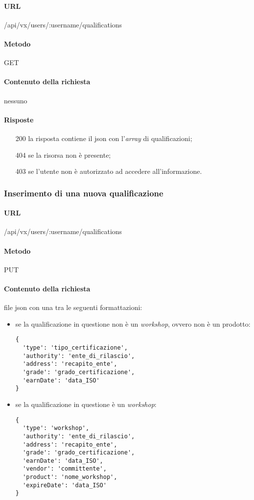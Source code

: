 \paragraph{URL}
/api/vx/users/:username/qualifications
\paragraph{Metodo}
GET
\paragraph{Contenuto della richiesta}
nessuno
\paragraph{Risposte}
\begin{itemize}
	\item[200] la risposta contiene il \gls{json} con l'\emph{array} di qualificazioni;
	\item[404] se la risorsa non è presente;
	\item[403] se l'utente non è autorizzato ad accedere all'informazione.
\end{itemize}


\subsubsection{Inserimento di una nuova qualificazione}
\paragraph{URL}
/api/vx/users/:username/qualifications
\paragraph{Metodo}
PUT
\paragraph{Contenuto della richiesta}
file \gls{json} con una tra le seguenti formattazioni:
\begin{itemize}
\item se la qualificazione in questione non è un \emph{workshop}, ovvero non è un prodotto:
\begin{verbatim}
{
  'type': 'tipo_certificazione',
  'authority': 'ente_di_rilascio',
  'address': 'recapito_ente',
  'grade': 'grado_certificazione',
  'earnDate': 'data_ISO'
}
\end{verbatim}
\item se la qualificazione in questione è un \emph{workshop}:
\begin{verbatim}
{
  'type': 'workshop',
  'authority': 'ente_di_rilascio',
  'address': 'recapito_ente',
  'grade': 'grado_certificazione',
  'earnDate': 'data_ISO',
  'vendor': 'committente',
  'product': 'nome_workshop',
  'expireDate': 'data_ISO'
}
\end{verbatim}
\end{itemize}
